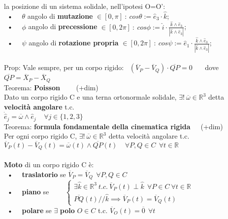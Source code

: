 \documentclass{article}
\begin{document}
la posizione di un sistema solidale, nell'ipotesi O=O':\\
%
%
\ • \ \ $\theta$ angolo di \textbf{mutazione} $\in [0,\pi]\ :\ cos\theta := \hat{e}_3\cdot\hat{k}$; \\
\ • \ \ $\phi$ angolo di \textbf{precessione} $\in [0,2\pi]\ :\ cos\phi := \hat{i}\cdot\frac{\hat{k}\wedge\hat{e}_3}{|\hat{k}\wedge\hat{e}_3|}$; \\
\ • \ \ $\psi$ angolo di \textbf{rotazione propria} $\in [0,2\pi]\ :\ cos\psi := \hat{e}_1\cdot\frac{\hat{k}\wedge\hat{e}_3}{|\hat{k}\wedge\hat{e}_3|}$;\\ \\
%
%
%
Prop: Vale sempre, per un corpo rigido: \ $(\overline{V}_P-\overline{V}_Q)\cdot\overline{QP} = 0$ \ \ \ dove \ $\overline{QP}=\overline{X}_P-\overline{X}_Q$ \\
%
%
%
Teorema: \textbf{Poisson} \ \ \ \ (+dim)\\
\phantom{\ } Dato un corpo rigido C e una terna ortonormale solidale, $\exists! \ \overline{\omega} \in \mathbb{R}^3$ detta \textbf{velocità angolare} t.c. \\
\phantom{} \hspace{2in} $ \dot{\hat{e}}_j = \overline{\omega}\wedge\hat{e}_j \ \ \ \ \ \forall j \in \{1,2,3\}$ \\
%
%
%
Teorema: \textbf{formula fondamentale della cinematica rigida}\ \ \ (+dim)\\
\phantom{\ } Per ogni corpo rigido C, $\exists! \ \overline{\omega} \in \mathbb{R}^3$ detta velocità angolare t.c. \\
\phantom{} \hspace{1.4in} $\overline{V}_P(t)-\overline{V}_Q(t) = \overline{\omega}(t)\wedge\overline{QP}(t) \ \ \ \ \ \forall P,Q \in C \ \ \forall t \in \mathbb{R}$ \\ \\
%
%
\textbf{Moto} di un corpo rigido C è: \\
\ • \ \ \textbf{traslatorio} se $\overline{V}_P = \overline{V}_Q \ \ \forall P,Q \in C$ \\
\ • \ \ \textbf{piano} se \ \ \ \ $\begin{cases} 
\exists \hat{k} \in \mathbb{R}^3 \ t.c. \ \overline{V}_P(t) \perp \hat{k} \ \ \forall P\in C \ \forall t\in\mathbb{R} \\
\overline{PQ}(t) /\!\!/ \hat{k} \implies \overline{V}_P(t) = \overline{V}_Q(t)  \end{cases}$ \\
\ • \ \ \textbf{polare} se $\exists$ \textbf{polo} $O \in C$ t.c. $\overline{V}_O(t)=\overline{0} \ \ \forall t$ \\
\end{document}
